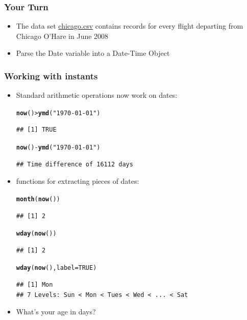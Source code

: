 \documentclass{beamer}\usepackage[]{graphicx}\usepackage[]{color}
\makeatletter
\newcommand{\hlnum}[1]{\textcolor[rgb]{0.686,0.059,0.569}{#1}}%
\newcommand{\hlstr}[1]{\textcolor[rgb]{0.192,0.494,0.8}{#1}}%
\newcommand{\hlopt}[1]{\textcolor[rgb]{0,0,0}{#1}}%
\newcommand{\hlstd}[1]{\textcolor[rgb]{0.345,0.345,0.345}{#1}}%
\newcommand{\hlkwc}[1]{\textcolor[rgb]{0.333,0.667,0.333}{#1}}%
\newcommand{\hlkwd}[1]{\textcolor[rgb]{0.737,0.353,0.396}{\textbf{#1}}}%
\newenvironment{kframe}{%
 \def\at@end@of@kframe{}%
 \ifinner\ifhmode%
  \def\at@end@of@kframe{\end{minipage}}%
  \begin{minipage}{\columnwidth}%
 \fi\fi%
 \def\FrameCommand##1{\hskip\@totalleftmargin \hskip-\fboxsep
 \colorbox{shadecolor}{##1}\hskip-\fboxsep
     \hskip-\linewidth \hskip-\@totalleftmargin \hskip\columnwidth}%
 \MakeFramed {\advance\hsize-\width
   \@totalleftmargin\z@ \linewidth\hsize
   \@setminipage}}%
 {\par\unskip\endMakeFramed%
 \at@end@of@kframe}
\newenvironment{knitrout}{}{} %
\makeatother
\begin{document}
\begin{frame}
\frametitle{Your Turn}
\begin{itemize}
\item The data set \href{http://www.hofroe.net/R\%20workshops/02-r-graphics/data/05-data/chicago.csv}{chicago.csv} contains records for every flight departing from Chicago O'Hare in June 2008\medskip
\item Parse the Date variable into a Date-Time Object
\end{itemize}
\end{frame}

\begin{frame}[fragile]
\frametitle{Working with instants}
\begin{itemize}
\item Standard arithmetic operations now work on dates:
\begin{knitrout}\footnotesize
{}\color{fgcolor}\begin{kframe}
\begin{alltt}
\hlkwd{now}\hlstd{()} \hlopt{>} \hlkwd{ymd}\hlstd{(}\hlstr{"1970-01-01"}\hlstd{)}
\end{alltt}
\begin{verbatim}
## [1] TRUE
\end{verbatim}
\begin{alltt}
\hlkwd{now}\hlstd{()} \hlopt{-} \hlkwd{ymd}\hlstd{(}\hlstr{"1970-01-01"}\hlstd{)}
\end{alltt}
\begin{verbatim}
## Time difference of 16112 days
\end{verbatim}
\end{kframe}
\end{knitrout}

\item functions for extracting pieces of dates:
\begin{knitrout}\footnotesize
{}\color{fgcolor}\begin{kframe}
\begin{alltt}
\hlkwd{month}\hlstd{(}\hlkwd{now}\hlstd{())}
\end{alltt}
\begin{verbatim}
## [1] 2
\end{verbatim}
\begin{alltt}
\hlkwd{wday}\hlstd{(}\hlkwd{now}\hlstd{())}
\end{alltt}
\begin{verbatim}
## [1] 2
\end{verbatim}
\begin{alltt}
\hlkwd{wday}\hlstd{(}\hlkwd{now}\hlstd{(),} \hlkwc{label}\hlstd{=}\hlnum{TRUE}\hlstd{)}
\end{alltt}
\begin{verbatim}
## [1] Mon
## 7 Levels: Sun < Mon < Tues < Wed < ... < Sat
\end{verbatim}
\end{kframe}
\end{knitrout}

\item What's your age in days?
\end{itemize}
\end{frame}
\end{document}
